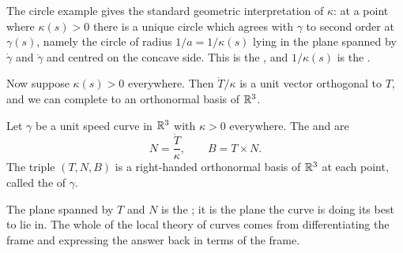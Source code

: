 \documentclass[a4paper]{scrartcl}
\begin{document}
The circle example gives the standard geometric interpretation of $\kappa$: at a point where $\kappa(s) > 0$ there is a unique circle which agrees with $\gamma$ to second order at $\gamma(s)$, namely the circle of radius $1/a = 1/\kappa(s)$ lying in the plane spanned by $\dot\gamma$ and $\ddot\gamma$ and centred on the concave side. This is the , and $1/\kappa(s)$ is the .

\begin{center}
\end{center}

Now suppose $\kappa(s) > 0$ everywhere. Then $\dot T/\kappa$ is a unit vector orthogonal to $T$, and we can complete to an orthonormal basis of $\mathbb{R}^3$.

\begin{definition}
    Let $\gamma$ be a unit speed curve in $\mathbb{R}^3$ with $\kappa > 0$ everywhere. The  and  are
    $$
    N = \frac{\dot T}{\kappa}, \qquad B = T \times N.
    $$
    The triple $(T, N, B)$ is a right-handed orthonormal basis of $\mathbb{R}^3$ at each point, called the  of $\gamma$.
\end{definition}

The plane spanned by $T$ and $N$ is the ; it is the plane the curve is doing its best to lie in. The whole of the local theory of curves comes from differentiating the frame and expressing the answer back in terms of the frame.
\end{document}
